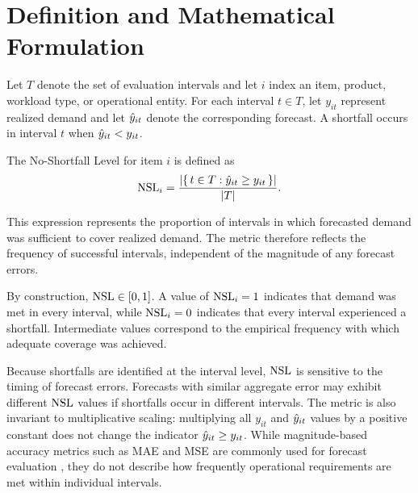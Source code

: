 \section{Definition and Mathematical Formulation}

Let $T$ denote the set of evaluation intervals and let $i$ index an item, product,
workload type, or operational entity. For each interval $t \in T$, let $y_{it}$
represent realized demand and let $\hat{y}_{it}$ denote the corresponding forecast.
A shortfall occurs in interval $t$ when $\hat{y}_{it} < y_{it}$.

The No-Shortfall Level for item $i$ is defined as
\[
\text{NSL}_i
=
\frac{\left| \{\, t \in T : \hat{y}_{it} \ge y_{it} \,\} \right|}{|T|}.
\]

This expression represents the proportion of intervals in which forecasted demand
was sufficient to cover realized demand. The metric therefore reflects the
frequency of successful intervals, independent of the magnitude of any forecast
errors.

By construction, $\text{NSL} \in [0,1]$. A value of $\text{NSL}_i = 1$ indicates that demand
was met in every interval, while $\text{NSL}_i = 0$ indicates that every interval
experienced a shortfall. Intermediate values correspond to the empirical frequency
with which adequate coverage was achieved.

Because shortfalls are identified at the interval level, $\text{NSL}$ is sensitive to the
timing of forecast errors. Forecasts with similar aggregate error may exhibit
different $\text{NSL}$ values if shortfalls occur in different intervals. The metric is
also invariant to multiplicative scaling: multiplying all $y_{it}$ and $\hat{y}_{it}$
values by a positive constant does not change the indicator $\hat{y}_{it} \ge y_{it}$.
While magnitude-based accuracy metrics such as MAE and MSE are commonly used for
forecast evaluation \citep{hyndman2006another}, they do not describe how frequently
operational requirements are met within individual intervals.
